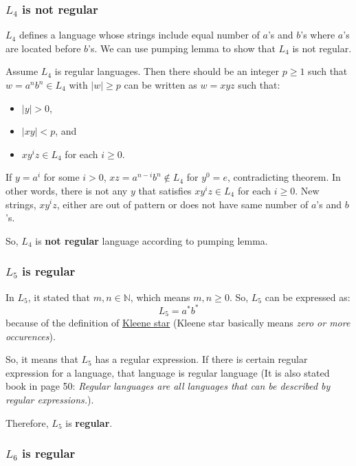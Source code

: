 \documentclass{article}
\begin{document}
\subsubsection*{$L_4$ is not regular}

\quad $L_4$ defines a language whose strings include equal number of $a$'s and $b$'s where $a$'s are located before $b$'s. We can use pumping lemma to show that $L_4$ is not regular.

Assume $L_4$ is regular languages. Then there should be an integer $p \geq 1$ such that $w = a^nb^n \in L_4$ with $|w| \geq p$ can be written as $w = xyz$ such that:
\begin{itemize}
  \item $|y| > 0$,
  \item $|xy| < p$, and
  \item $xy^iz \in L_4$ for each $i \geq 0$.
\end{itemize}

If $y = a^i$ for some $i > 0$, $xz = a^{n-i}b^n \notin L_4$ for $y^0 = e$, contradicting theorem. In other words, there is not any $y$ that satisfies $xy^iz \in L_4$ for each $i \geq 0$. New strings, $xy^iz$, either are out of pattern or does not have same number of $a$'s and $b$'s.

So, $L_4$ is \textbf{not regular} language according to pumping lemma.

\subsubsection*{$L_5$ is regular}

\quad In $L_5$, it stated that $m, n \in \mathbb{N}$, which means $m, n \geq 0$. So, $L_5$ can be expressed as:
\begin{equation*}
  L_5 = a^*b^*
\end{equation*}
because of the definition of \href{https://en.wikipedia.org/wiki/Kleene_star}{Kleene star} (Kleene star basically means \textit{zero or more occurences}).

So, it means that $L_5$ has a regular expression. If there is certain regular expression for a language, that language is regular language (It is also stated book in page 50: \textit{Regular languages are all languages that can be described by regular expressions.}).

Therefore, $L_5$ is \textbf{regular}.

\subsubsection*{$L_6$ is regular}
\end{document}
